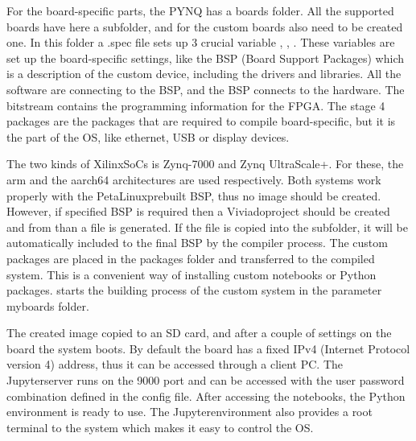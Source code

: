 For the board-specific parts, the PYNQ has a boards folder.
All the supported boards have here a subfolder, and for the custom boards also need to be created one.
In this folder a .spec file sets up 3 crucial variable , , . 
These variables are set up the board-specific settings, like the BSP (Board Support Packages) which is a description of the custom device, including the drivers and libraries.
All the software are connecting to the BSP, and the BSP connects to the hardware.
The bitstream contains the programming information for the FPGA.
The stage 4 packages are the packages that are required to compile board-specific, but it is the part of the OS, like ethernet, USB or display devices.

The two kinds of Xilinx\texttrademark SoCs is Zynq-7000 and Zynq UltraScale+\texttrademark.
For these, the arm and the aarch64 architectures are used respectively.
Both systems work properly with the PetaLinux\texttrademark prebuilt BSP, thus no image should be created.
However, if specified BSP is required then a Viviado\texttrademark project should be created and from than a  file is generated.
If the  file is copied into the  subfolder, it will be automatically included to the final BSP by the compiler process.
The custom packages are placed in the packages folder and transferred to the compiled system.
This is a convenient way of installing custom notebooks or Python packages.
 starts the building process of the custom system in the parameter myboards folder.

The created image copied to an SD card, and after a couple of settings on the board the system boots.
By default the board has a fixed IPv4 (Internet Protocol version 4) address, thus it can be accessed through a client PC.
The Jupyter\texttrademark server runs on the 9000 port and can be accessed with the user password combination defined in the config file.
After accessing the notebooks, the Python environment is ready to use.
The Jupyter\texttrademark environment also provides a root terminal to the system which makes it easy to control the OS.

